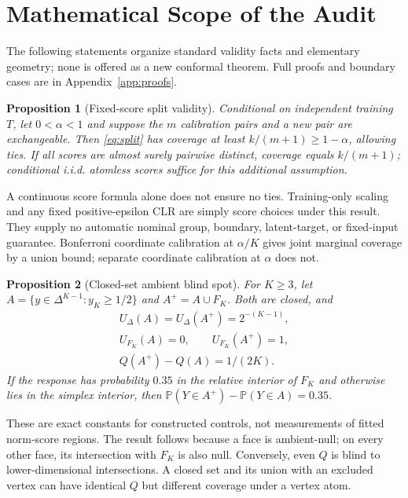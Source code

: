 \documentclass{article}
\theoremstyle{plain}
\newtheorem{proposition}{Proposition}
\newcommand{\simp}{\Delta^{K-1}}
\newcommand{\Prob}{\mathbb{P}}
\newcommand{\Udel}{U_{\Delta}}
\begin{document}
\section{Mathematical Scope of the Audit}
\label{sec:theory}
The following statements organize standard validity facts and elementary geometry; none is offered as a new conformal theorem. Full proofs and boundary cases are in Appendix~\ref{app:proofs}.

\begin{proposition}[Fixed-score split validity]
\label{prop:split}
Conditional on independent training $T$, let $0<\alpha<1$ and suppose the $m$ calibration pairs and a new pair are exchangeable. Then \eqref{eq:split} has coverage at least $k/(m+1)\geq1-\alpha$, allowing ties. If all scores are almost surely pairwise distinct, coverage equals $k/(m+1)$; conditional i.i.d. atomless scores suffice for this additional assumption.
\end{proposition}
A continuous score formula alone does not ensure no ties. Training-only scaling and any fixed positive-epsilon CLR are simply score choices under this result. They supply no automatic nominal group, boundary, latent-target, or fixed-input guarantee. Bonferroni coordinate calibration at $\alpha/K$ gives joint marginal coverage by a union bound; separate coordinate calibration at $\alpha$ does not.

\begin{proposition}[Closed-set ambient blind spot]
\label{prop:geometry}
For $K\geq3$, let $A=\{y\in\simp:y_K\geq1/2\}$ and $A^+=A\cup F_K$. Both are closed, and
\begin{equation}
 \begin{gathered}
 \Udel(A)=\Udel(A^+)=2^{-(K-1)},\\
 U_{F_K}(A)=0,\qquad U_{F_K}(A^+)=1,\\
 Q(A^+)-Q(A)=1/(2K).
 \end{gathered}
 \label{eq:control}
\end{equation}
If the response has probability $0.35$ in the relative interior of $F_K$ and otherwise lies in the simplex interior, then $\Prob(Y\in A^+)-\Prob(Y\in A)=0.35$.
\end{proposition}
These are exact constants for constructed controls, not measurements of fitted norm-score regions. The result follows because a face is ambient-null; on every other face, its intersection with $F_K$ is also null. Conversely, even $Q$ is blind to lower-dimensional intersections. A closed set and its union with an excluded vertex can have identical $Q$ but different coverage under a vertex atom.
\end{document}
